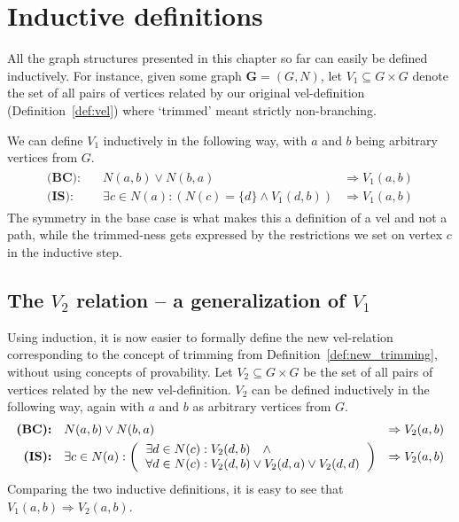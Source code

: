 


\section{Inductive definitions}
\label{sec:Inductive definitions}
All the graph structures presented in this chapter so far can easily be defined inductively.
For instance, given some graph $\mathbf{G}=(G,N)$, let $V_1 \subseteq G \times G$ denote the set of all pairs of vertices related by our original vel-definition (Definition~\ref{def:vel}) where `trimmed' meant strictly non-branching.

We can define $V_1$ inductively in the following way, with $a$ and $b$ being arbitrary vertices from $G$.
\begin{align}
  \begin{aligned}
    \textbf{(BC):}&\quad N(a,b) \vee N(b,a) &\Rightarrow  V_1(a,b)\\
    \textbf{(IS):}&\quad \exists c \in N(a): (N(c) =\{d\} \wedge V_1(d,b)) &\Rightarrow V_1(a,b)
  \end{aligned}
\end{align}
The symmetry in the base case is what makes this a definition of a vel and not a path, while the trimmed-ness gets expressed by the restrictions we set on vertex $c$ in the inductive step.
\subsection{The $V_2$ relation -- a generalization of $V_1$}
\label{sub:The V2 construction}
Using induction, it is now easier to formally define the new vel-relation corresponding to the concept of trimming from Definition~\ref{def:new_trimming}, without using concepts of provability.
Let $V_2 \subseteq G \times G$ be the set of all pairs of vertices related by the new vel-definition.
$V_2$ can be defined inductively in the following way, again with $a$ and $b$ as arbitrary vertices from $G$.
\begin{align}
  \begin{aligned}
    \textbf{(BC):}&\quad N(a,b) \vee N(b,a) &\Rightarrow V_2(a,b)\\
    \textbf{(IS):}&\quad \exists c \in N(a):
    \left ( \begin{tabular}{l}
    $\exists d \in N(c): V_2(d,b) \quad \wedge$\\
    $\forall d \in N(c): V_2(d,b) \vee V_2(d,a) \vee V_2(d,d)$
    \end{tabular} \right )
    &\Rightarrow V_2(a,b)
  \end{aligned}\label{eq:def_v2}
\end{align}
Comparing the two inductive definitions, it is easy to see that $V_1(a,b) \Rightarrow V_2(a,b)$.

